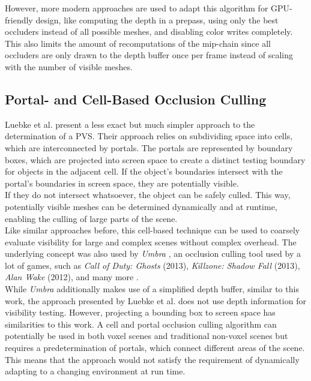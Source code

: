 \noindent
However, more modern approaches are used to adapt this algorithm for \ac{GPU}-friendly design, like computing the depth 
in a prepass, using only the best occluders instead of all possible meshes, and disabling color writes completely. This 
also limits the amount of recomputations of the mip-chain since all occluders are only drawn to the depth buffer once per 
frame instead of scaling with the number of visible meshes.


\subsection*{Portal- and Cell-Based Occlusion Culling}

Luebke et al. \cite{Luebke1995} present a less exact but much simpler approach to the determination
of a \ac{PVS}. Their approach relies on subdividing space into cells, which are interconnected by 
portals. The portals are represented by boundary boxes, which are projected into screen space to 
create a distinct testing boundary for objects in the adjacent cell. If the object's boundaries 
intersect with the portal's boundaries in screen space, they are potentially visible.  \\

\noindent
If they do not intersect whatsoever, the object can be safely culled. This way, potentially visible 
meshes can be determined dynamically and at runtime, enabling the culling of large parts of the scene. \\

\noindent
Like similar approaches before, this cell-based technique can be used to coarsely evaluate visibility 
for large and complex scenes without complex overhead. The underlying concept was also used by 
\emph{Umbra} \cite{Umbra2024}, an occlusion culling tool used by a lot of games, such as 
\emph{Call of Duty: Ghosts} (2013), \emph{Killzone: Shadow Fall} (2013), \emph{Alan Wake} (2012), 
and many more \cite{UmbraWiki,CallOfDutyGhostsCredits,KillzoneUmbra,AlanWakeUmbra}. \\

\noindent
While \emph{Umbra} additionally makes use of a simplified depth buffer, similar to this work, the approach 
presented by Luebke et al. does not use depth information for visibility testing. However, projecting a 
bounding box to screen space has similarities to this work. A cell and portal occlusion culling algorithm 
can potentially be used in both voxel scenes and traditional non-voxel scenes but requires a 
predetermination of portals, which connect different areas of the scene. This means that the approach would 
not satisfy the requirement of dynamically adapting to a changing environment at run time. \\



